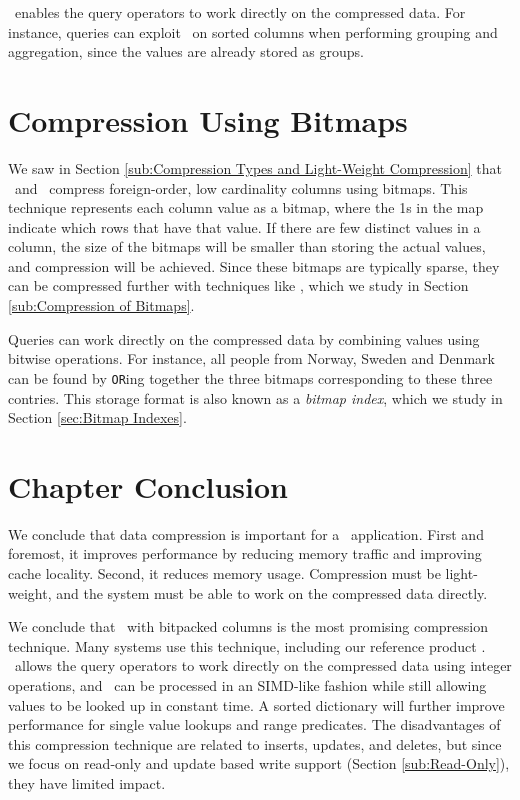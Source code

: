 \rle~enables the query operators to work directly on the compressed data. For instance, queries can exploit \rle~on sorted columns when performing grouping and aggregation, since the values are already stored as groups. 

\section{Compression Using Bitmaps}
\label{sec:Compression Using Bitmaps}
We saw in Section \ref{sub:Compression Types and Light-Weight Compression} that \cstore~and \vertica~compress foreign-order, low cardinality columns using bitmaps. This technique represents each column value as a bitmap, where the 1s in the map indicate which rows that have that value. If there are few distinct values in a column, the size of the bitmaps will be smaller than storing the actual values, and compression will be achieved. Since these bitmaps are typically sparse, they can be compressed further with techniques like \rle, which we study in Section \ref{sub:Compression of Bitmaps}.

Queries can work directly on the compressed data by combining values using bitwise operations. For instance, all people from Norway, Sweden and Denmark can be found by \texttt{OR}ing together the three bitmaps corresponding to these three contries. This storage format is also known as a \textit{bitmap index}, which we study in Section \ref{sec:Bitmap Indexes}.

\section{Chapter Conclusion}
\label{sec:Chapter Conclusion}
We conclude that data compression is important for a \bd~application. First and foremost, it improves performance by reducing memory traffic and improving cache locality. Second, it reduces memory usage. Compression must be light-weight, and the system must be able to work on the compressed data directly.

We conclude that \de~with bitpacked columns is the most promising compression technique. Many systems use this technique, including our reference product \qlikview. \de~allows the query operators to work directly on the compressed data using integer operations, and \bp~can be processed in an SIMD-like fashion while still allowing values to be looked up in constant time. A sorted dictionary will further improve performance for single value lookups and range predicates. The disadvantages of this compression technique are related to inserts, updates, and deletes, but since we focus on read-only and update based write support (Section \ref{sub:Read-Only}), they have limited impact.

